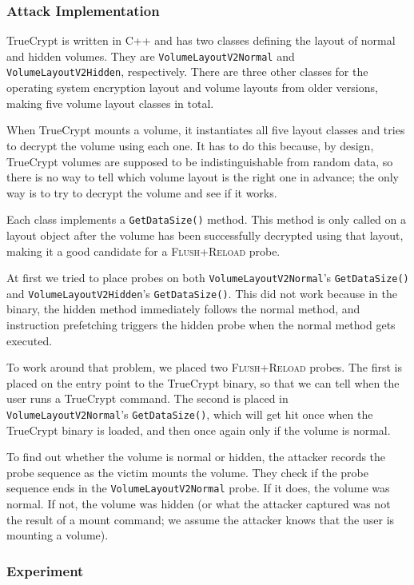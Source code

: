 \documentclass[letterpaper,twocolumn,10pt]{article}
\begin{document}
\subsubsection{Attack Implementation}

TrueCrypt is written in C++ and has two classes defining the layout of normal
and hidden volumes. They are \texttt{VolumeLayout\-V2Normal} and
\texttt{VolumeLayout\-V2Hidden}, respectively. There are three other classes for
the operating system encryption layout and volume layouts from older versions,
making five volume layout classes in total.

When TrueCrypt mounts a volume, it instantiates all five layout classes and
tries to decrypt the volume using each one. It has to do this because, by
design, TrueCrypt volumes are supposed to be indistinguishable from random data,
so there is no way to tell which volume layout is the right one in advance; the
only way is to try to decrypt the volume and see if it works.

Each class implements a \texttt{GetDataSize()} method. This method is only
called on a layout object after the volume has been successfully decrypted using
that layout, making it a good candidate for a \textsc{Flush+Reload} probe.

At first we tried to place probes on both \texttt{VolumeLayout\-V2Normal}'s
\texttt{GetDataSize()} and \texttt{VolumeLayout\-V2Hidden}'s
\texttt{GetDataSize()}. This did not work because in the binary, the hidden
method immediately follows the normal method, and instruction prefetching
triggers the hidden probe when the normal method gets executed.

To work around that problem, we placed two \textsc{Flush+Reload} probes. The
first is placed on the entry point to the TrueCrypt binary, so that we can tell
when the user runs a TrueCrypt command. The second is placed in
\texttt{VolumeLayout\-V2Normal}'s \texttt{GetDataSize()}, which will get hit
once when the TrueCrypt binary is loaded, and then once again only if the volume
is normal.

To find out whether the volume is normal or hidden, the attacker records the
probe sequence as the victim mounts the volume. They check if the probe sequence
ends in the \texttt{VolumeLayout\-V2Normal} probe. If it does, the volume was
normal. If not, the volume was hidden (or what the attacker captured was not the
result of a mount command; we assume the attacker knows that the user is
mounting a volume).

\subsubsection{Experiment}
\end{document}
